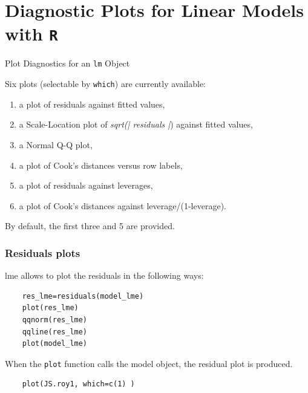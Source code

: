 \documentclass[Main.tex]{subfiles}
\begin{document}
\section{Diagnostic Plots for Linear Models with \texttt{R}}
Plot Diagnostics for an \texttt{lm} Object


Six plots (selectable by \texttt{which}) are currently available: 
\begin{enumerate}
	\item a plot of residuals against fitted values, 
	\item a Scale-Location plot of \textit{sqrt(| residuals |}) against fitted values, 
	\item a Normal Q-Q plot, 
	\item a plot of Cook's distances versus row labels, 
	\item a plot of residuals against leverages, 
	\item a plot of Cook's distances against leverage/(1-leverage).
\end{enumerate} By default, the first three and 5 are provided.
\subsubsection{Residuals plots}

lme allows to plot the residuals in the following ways:

\begin{framed}
	\begin{verbatim}
	res_lme=residuals(model_lme)
	plot(res_lme)
	qqnorm(res_lme)
	qqline(res_lme)
	plot(model_lme)
	\end{verbatim}
\end{framed}

When the \texttt{plot} function calls the model object, the residual plot is produced.




\begin{framed}
	\begin{verbatim}
	plot(JS.roy1, which=c(1) )
	\end{verbatim}
\end{framed}
\end{document}
